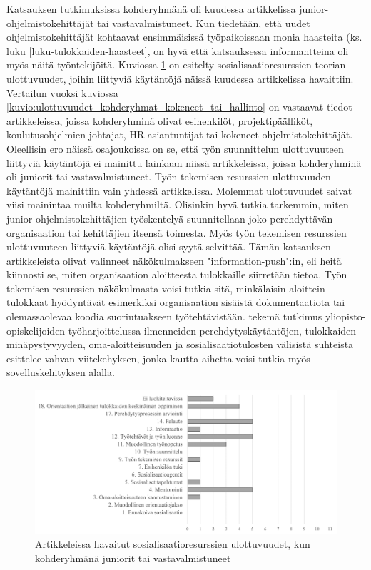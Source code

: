 \documentclass[utf8]{gradu3}
\begin{document}
Katsauksen tutkimuksissa kohderyhmänä oli kuudessa artikkelissa junior-ohjelmistokehittäjät tai vastavalmistuneet. Kun tiedetään, että uudet ohjelmistokehittäjät kohtaavat ensimmäisissä työpaikoissaan monia haasteita (ks. luku \ref{luku-tulokkaiden-haasteet}, on hyvä että katsauksessa informantteina oli myös näitä työntekijöitä. Kuviossa \ref{kuvio:ulottuvuudet_kohderyhmat_juniorit} on esitelty sosialisaatioresurssien teorian ulottuvuudet, joihin liittyviä käytäntöjä näissä kuudessa artikkelissa havaittiin. Vertailun vuoksi kuviossa \ref{kuvio:ulottuvuudet_kohderyhmat_kokeneet_tai_hallinto} on vastaavat tiedot artikkeleissa, joissa kohderyhminä olivat esihenkilöt, projektipäälliköt, koulutusohjelmien johtajat, HR-asiantuntijat tai kokeneet ohjelmistokehittäjät. Oleellisin ero näissä osajoukoissa on se, että työn suunnittelun ulottuvuuteen liittyviä käytäntöjä ei mainittu lainkaan niissä artikkeleissa, joissa kohderyhminä oli juniorit tai vastavalmistuneet. Työn tekemisen resurssien ulottuvuuden käytäntöjä mainittiin vain yhdessä artikkelissa. Molemmat ulottuvuudet saivat viisi mainintaa muilta kohderyhmiltä. Olisinkin hyvä tutkia tarkemmin, miten junior-ohjelmistokehittäjien työskentelyä suunnitellaan joko perehdyttävän organisaation tai kehittäjien itsensä toimesta. Myös työn tekemisen resurssien ulottuvuuteen liittyviä käytäntöjä olisi syytä selvittää. Tämän katsauksen artikkeleista \textcite{yates-ym-2020} olivat valinneet näkökulmakseen "information-push":in, eli heitä kiinnosti se, miten organisaation aloitteesta tulokkaille siirretään tietoa. Työn tekemisen resurssien näkökulmasta voisi tutkia sitä, minkälaisin aloittein tulokkaat hyödyntävät esimerkiksi organisaation sisäistä dokumentaatiota tai olemassaolevaa koodia suoriutuakseen työtehtävistään. \textcite{gruman-ym-2006} tekemä tutkimus yliopisto-opiskelijoiden työharjoittelussa ilmenneiden perehdytyskäytäntöjen, tulokkaiden minäpystyvyyden, oma-aloitteisuuden ja sosialisaatiotulosten välisistä suhteista esittelee vahvan viitekehyksen, jonka kautta aihetta voisi tutkia myös sovelluskehityksen alalla.

\begin{figure}[h]
    \centering
    \includegraphics[width=\textwidth]{media/ulottuvuudet_kohderyhmat_juniorit-tai_vastavalmistuneet.png}
    \caption{Artikkeleissa havaitut sosialisaatioresurssien ulottuvuudet, kun kohderyhmänä juniorit tai vastavalmistuneet}
    \label{kuvio:ulottuvuudet_kohderyhmat_juniorit}
\end{figure}
\end{document}
